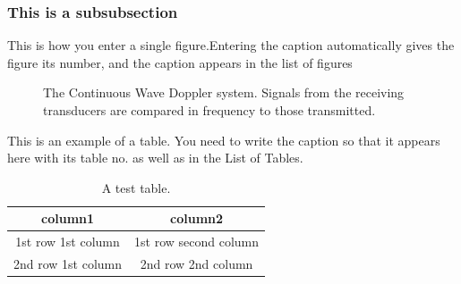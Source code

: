 \subsubsection{This  is a subsubsection} \label{This  is a subsubsection}
\noindent This is how you enter a single figure.Entering the caption automatically gives the figure its number, and the caption appears in the list of figures
\begin{figure}[H]
{\centering {}\par}
\caption{The Continuous Wave Doppler system. Signals from the receiving transducers are compared in frequency to those transmitted.}
\end{figure}
\noindent This is an example of a table. You need to write the caption so that it appears here with its table no. as well as in the List of Tables.
\begin{table}[!ht]
\centering
\begin{tabular}{||c|c||}
\hline\hline
column1 & column2\\
\hline\hline
1st row 1st column & 1st row second column\\
\hline
2nd row 1st column & 2nd row 2nd column\\
\hline\hline
  \end{tabular}
  \caption{A test table.}
\end{table}
\pagebreak